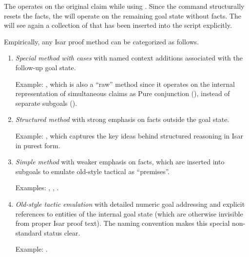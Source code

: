 \begin{isabellebody}
\begin{isamarkuptext}
  The  operates on the original claim while
  using .  Since the \hyperlink{command.apply}{\mbox{}} command
  structurally resets the facts, the  will
  operate on the remaining goal state without facts.  The  will see again a collection of  that has been inserted into the script explicitly.

  \medskip Empirically, any Isar proof method can be categorized as
  follows.

  \begin{enumerate}

  \item \emph{Special method with cases} with named context additions
  associated with the follow-up goal state.

  Example: \hyperlink{method.induct}{\mbox{}}, which is also a ``raw'' method since it
  operates on the internal representation of simultaneous claims as
  Pure conjunction (), instead of separate
  subgoals ().

  \item \emph{Structured method} with strong emphasis on facts outside
  the goal state.

  Example: \hyperlink{method.rule}{\mbox{}}, which captures the key ideas behind
  structured reasoning in Isar in purest form.

  \item \emph{Simple method} with weaker emphasis on facts, which are
  inserted into subgoals to emulate old-style tactical as
  ``premises''.

  Examples: \hyperlink{method.simp}{\mbox{}}, \hyperlink{method.blast}{\mbox{}}, \hyperlink{method.auto}{\mbox{}}.

  \item \emph{Old-style tactic emulation} with detailed numeric goal
  addressing and explicit references to entities of the internal goal
  state (which are otherwise invisible from proper Isar proof text).
  The naming convention  makes this special
  non-standard status clear.

  Example: \hyperlink{method.rule-tac}{\mbox{}}.


\end{enumerate}
\end{isamarkuptext}
\end{isabellebody}
